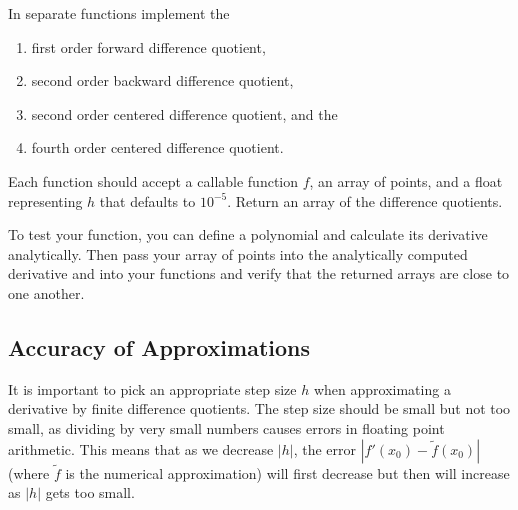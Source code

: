 \begin{problem}
In separate functions implement the
\begin{enumerate}
\item first order forward difference quotient,
\item second order backward difference quotient,
\item second order centered difference quotient, and the
\item fourth order centered difference quotient.
\end{enumerate}
Each function should accept a callable function $f$, an array of points, and a float representing $h$ that defaults to $10^{-5}$.
Return an array of the difference quotients.

To test your function, you can define a polynomial and calculate its derivative analytically.
Then pass your array of points into the analytically computed derivative and into your functions and verify that the returned arrays are close to one another.
\end{problem}
\subsection*{Accuracy of Approximations} %

It is important to pick an appropriate step size $h$ when approximating a derivative by finite difference quotients.
The step size should be small but not too small, as dividing by very small numbers causes errors in floating point arithmetic.
This means that as we decrease $|h|$, the error $|f'(x_0)-\tilde{f}(x_0)|$ (where $\tilde{f}$ is the numerical approximation) will first decrease but then will increase as $|h|$ gets too small.

